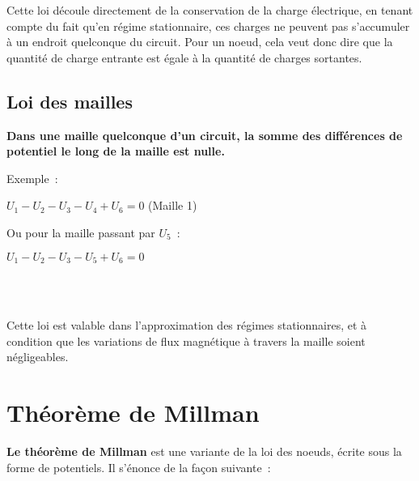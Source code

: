 \smallskip
Cette loi découle directement de la conservation de la charge électrique, en tenant compte du fait qu'en régime stationnaire, ces charges ne peuvent pas s'accumuler à un endroit quelconque du circuit. Pour un noeud, cela veut donc dire que la quantité de charge entrante est égale à la quantité de charges sortantes.\\

\subsection*{Loi des mailles}
\vspace{0.5cm}
\begin{minipage}{3cm}
\begin{center}

\end{center}
\end{minipage}
\hspace{1cm}
\begin{minipage}{10cm} 
\textbf{Dans une maille quelconque d'un circuit, la somme des différences de potentiel le long de la maille est nulle.} \\

\hspace{1cm}
\begin{minipage}{8cm} 
Exemple~:
\begin{center}
$  U_1 - U_2 - U_3 - U_4 + U_6 = 0$ (Maille 1) 
\end{center}
Ou pour la maille passant par $U_5$~:
\begin{center}
$ U_1 - U_2 -U_3 - U_5 + U_6 = 0 $
	\end{center}
\end{minipage}\\
\end{minipage}\\

\smallskip
Cette loi est valable dans l'approximation des régimes stationnaires, et à condition que les variations de flux magnétique à travers la maille soient négligeables.

\section{Théorème de Millman}

\textbf{Le théorème de Millman} est une variante de la loi des noeuds, écrite sous la forme de potentiels. Il s'énonce de la façon suivante~:\\

